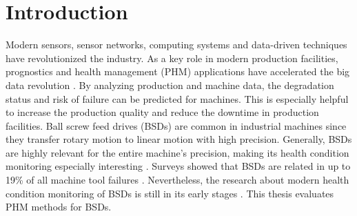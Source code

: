 
\chapter{Introduction}
Modern sensors, sensor networks, computing systems and data-driven techniques have revolutionized the industry. As a key role in modern production facilities, prognostics and health management (PHM) applications have accelerated the big data revolution \cite{ZHAO2019213}. By analyzing production and machine data, the degradation status and risk of failure can be predicted for machines. This is especially helpful to increase the production quality and reduce the downtime in production facilities. Ball screw feed drives (BSDs) are common in industrial machines since they transfer rotary motion to linear motion with high precision. Generally, BSDs are highly relevant for the entire machine’s precision, making its health condition monitoring especially interesting \cite{LiPin2018}. Surveys showed that BSDs are related in up to 19\% of all machine tool failures \cite{Denkena2021}. Nevertheless, the research about modern health condition monitoring of BSDs is still in its early stages \cite{LiPin2018}. This thesis evaluates PHM methods for BSDs.


